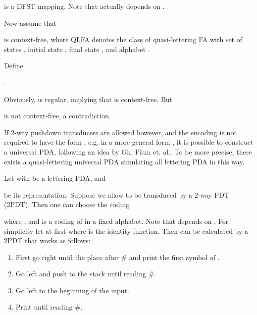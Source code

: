 \documentclass{eptcs}
\begin{document}
{{{\hspace{1.5cm}



 is a DFST mapping.
Note that  actually depends on .

\medskip

Now assume that



\hspace{.8cm}

is context-free, where QLFA denotes the class of quasi-lettering FA with
set of states , initial state , final state , and alphabet .

Define


\hspace{2cm}.


Obviously,  is regular, implying that  is context-free. But



\hspace{1.2cm}

is not context-free, a contradiction.

\bigskip

If 2-way pushdown transducers are allowed however, and the encoding is not required to
have the form ,
e.g. in a more general form ,
 it is possible to construct a universal PDA,
following an idea by Gh. P\u{a}un et. al.. To be more precise, there exists a
quasi-lettering universal PDA simulating all lettering PDA
in this way.


\medskip
Let  with 
be a lettering PDA, and 

be its representation.
Suppose we allow  to be transduced by a 2-way PDT
 (2PDT).
Then one can choose the coding

where , and  is a coding of  in a fixed alphabet.
Note that  depends on . 
For simplicity let  at first where  is the
identity function. Then  can be 
calculated by a 2PDT that works as follows:
\begin{enumerate}

	\item First go right until the place after \# and print the first symbol of .

	\item Go left and push  to the stack until reading \#.

	\item Go left to the beginning of the input. 

	\item Print  until reading \#.
	

\end{enumerate}}}}
\end{document}
